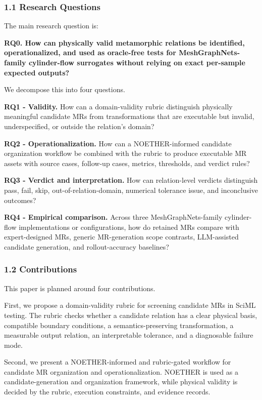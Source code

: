 \subsubsection{1.1 Research Questions}\label{research-questions}

The main research question is:

\textbf{RQ0. How can physically valid metamorphic relations be
identified, operationalized, and used as oracle-free tests for
MeshGraphNets-family cylinder-flow surrogates without relying on exact
per-sample expected outputs?}

We decompose this into four questions.

\textbf{RQ1 - Validity.} How can a domain-validity rubric distinguish
physically meaningful candidate MRs from transformations that are
executable but invalid, underspecified, or outside the relation's
domain?

\textbf{RQ2 - Operationalization.} How can a NOETHER-informed candidate
organization workflow be combined with the rubric to produce executable
MR assets with source cases, follow-up cases, metrics, thresholds, and
verdict rules?

\textbf{RQ3 - Verdict and interpretation.} How can relation-level
verdicts distinguish pass, fail, skip, out-of-relation-domain, numerical
tolerance issue, and inconclusive outcomes?

\textbf{RQ4 - Empirical comparison.} Across three MeshGraphNets-family
cylinder-flow implementations or configurations, how do retained MRs
compare with expert-designed MRs, generic MR-generation scope contrasts,
LLM-assisted candidate generation, and rollout-accuracy baselines?

\subsubsection{1.2 Contributions}\label{contributions}

This paper is planned around four contributions.

First, we propose a domain-validity rubric for screening candidate MRs
in SciML testing. The rubric checks whether a candidate relation has a
clear physical basis, compatible boundary conditions, a
semantics-preserving transformation, a measurable output relation, an
interpretable tolerance, and a diagnosable failure mode.

Second, we present a NOETHER-informed and rubric-gated workflow for
candidate MR organization and operationalization. NOETHER is used as a
candidate-generation and organization framework, while physical validity
is decided by the rubric, execution constraints, and evidence records.

